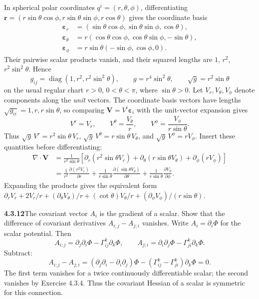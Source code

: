 In spherical polar coordinates $q^i=(r,\theta,\phi)$, differentiating
$\mathbf r=(r\sin\theta\cos\phi,r\sin\theta\sin\phi,r\cos\theta)$ gives
the coordinate basis
\begin{align*}
\boldsymbol\varepsilon_r
&=(\sin\theta\cos\phi,\sin\theta\sin\phi,\cos\theta),\\
\boldsymbol\varepsilon_\theta
&=r(\cos\theta\cos\phi,\cos\theta\sin\phi,-\sin\theta),\\
\boldsymbol\varepsilon_\phi
&=r\sin\theta(-\sin\phi,\cos\phi,0).
\end{align*}
Their pairwise scalar products vanish, and their squared lengths are
$1$, $r^2$, $r^2\sin^2\theta$. Hence
\[
g_{ij}=\operatorname{diag}(1,r^2,r^2\sin^2\theta),\qquad
g=r^4\sin^2\theta,\qquad
\sqrt g=r^2\sin\theta
\]
on the usual regular chart $r>0$, $0<\theta<\pi$, where $\sin\theta>0$.
Let $V_r,V_\theta,V_\phi$ denote components along the \emph{unit} vectors.
The coordinate basis vectors have lengths $\sqrt{g_{ii}}=1,r,r\sin\theta$,
so comparing $\mathbf V=V^i\boldsymbol\varepsilon_i$ with the unit-vector
expansion gives
\[
V^r=V_r,\qquad V^\theta=\frac{V_\theta}{r},\qquad
V^\phi=\frac{V_\phi}{r\sin\theta}.
\]
Thus $\sqrt g\,V^r=r^2\sin\theta\,V_r$, $\sqrt g\,V^\theta=r\sin\theta\,V_\theta$,
and $\sqrt g\,V^\phi=rV_\phi$. Insert these quantities before differentiating:
\begin{align*}
\nabla\cdot\mathbf V
&=\frac1{r^2\sin\theta}
 \left[\partial_r(r^2\sin\theta V_r)
       +\partial_\theta(r\sin\theta V_\theta)
       +\partial_\phi(rV_\phi)\right]\\
&=\boxed{\frac1{r^2}\frac{\partial(r^2V_r)}{\partial r}
 +\frac1{r\sin\theta}\frac{\partial(\sin\theta V_\theta)}{\partial\theta}
 +\frac1{r\sin\theta}\frac{\partial V_\phi}{\partial\phi}}.
\end{align*}
Expanding the products gives the equivalent form
$\partial_rV_r+2V_r/r+(\partial_\theta V_\theta)/r+
(\cot\theta)V_\theta/r+(\partial_\phi V_\phi)/(r\sin\theta)$.

\par\bigskip
\noindent\textbf{4.3.12}\quad The covariant vector $A_{i}$ is the gradient of
a  scalar. Show that the difference of covariant derivatives
$A_{i;j}-A_{j;i}$ vanishes.
\solution
Write $A_i=\partial_i\Phi$ for the scalar potential. Then
\[
A_{i;j}=\partial_j\partial_i\Phi-\Gamma^k_{ij}\partial_k\Phi,
\qquad
A_{j;i}=\partial_i\partial_j\Phi-\Gamma^k_{ji}\partial_k\Phi.
\]
Subtract:
\[
A_{i;j}-A_{j;i}
=(\partial_j\partial_i-\partial_i\partial_j)\Phi
 -(\Gamma^k_{ij}-\Gamma^k_{ji})\partial_k\Phi=0.
\]
The first term vanishes for a twice continuously differentiable scalar;
the second vanishes by Exercise 4.3.4. Thus the covariant Hessian of a
scalar is symmetric for this connection.

